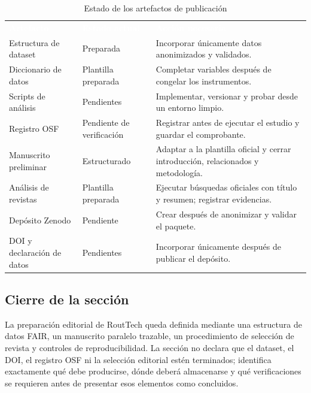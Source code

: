 \documentclass[12pt,a4paper]{article}
\begin{document}
\begin{table}[H]
\centering
\caption{Estado de los artefactos de publicación}
\label{tab:estado-publicacion}
\small
{}
\begin{tabularx}{\textwidth}{L{4.25cm} L{3.0cm} Y}
\textcolor{white}{\textbf{Artefacto}} &
\textcolor{white}{\textbf{Estado actual}} &
\textcolor{white}{\textbf{Acción necesaria}}\\
Estructura de dataset & Preparada & Incorporar únicamente datos anonimizados y validados.\\
Diccionario de datos & Plantilla preparada & Completar variables después de congelar los instrumentos.\\
Scripts de análisis & Pendientes & Implementar, versionar y probar desde un entorno limpio.\\
Registro OSF & Pendiente de verificación & Registrar antes de ejecutar el estudio y guardar el comprobante.\\
Manuscrito preliminar & Estructurado & Adaptar a la plantilla oficial y cerrar introducción, relacionados y metodología.\\
Análisis de revistas & Plantilla preparada & Ejecutar búsquedas oficiales con título y resumen; registrar evidencias.\\
Depósito Zenodo & Pendiente & Crear después de anonimizar y validar el paquete.\\
DOI y declaración de datos & Pendientes & Incorporar únicamente después de publicar el depósito.\\
\end{tabularx}
\end{table}

\subsection{Cierre de la sección}

La preparación editorial de RoutTech queda definida mediante una estructura de datos FAIR, un manuscrito paralelo trazable, un procedimiento de selección de revista y controles de reproducibilidad. La sección no declara que el dataset, el DOI, el registro OSF ni la selección editorial estén terminados; identifica exactamente qué debe producirse, dónde deberá almacenarse y qué verificaciones se requieren antes de presentar esos elementos como concluidos.



\end{document}

